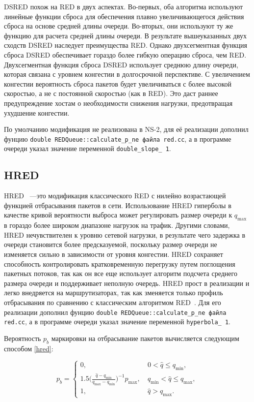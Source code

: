 DSRED похож на RED в двух аспектах. Во-первых, оба алгоритма используют линейные функции сброса для обеспечения плавно 
увеличивающегося действия сброса на основе средней длины очереди. Во-вторых, они используют ту же функцию для расчета 
средней длины очереди. В результате вышеуказанных двух сходств DSRED наследует преимущества RED. 
Однако двухсегментная функция сброса DSRED обеспечивает гораздо более гибкую операцию сброса, чем RED.
Двухсегментная функция сброса DSRED использует среднюю длину очереди, которая связана с уровнем конгестии в долгосрочной перспективе. 
С увеличением конгестии вероятность сброса пакетов будет увеличиваться с более высокой скоростью, а не с постоянной скоростью (как в RED). 
Это даст раннее предупреждение хостам о необходимости снижения нагрузки, предотвращая ухудшение конгестии.

По умолчанию модификация не реализована в NS-2, для её реализации дополнил фунцию \verb|double REDQueue::calculate_p_ne файла red.cc|, 
а в программе очереди указал значение переменной \verb|double_slope_ 1|. 


\subsection{HRED}

HRED ~---это модификация классического RED с нилейно возрастающей функцией отбрасывания пакетов в сети.
Использование HRED гиперболы в качестве кривой вероятности выброса может регулировать размер очереди к $q_{\max}$ 
в гораздо более широком диапазоне нагрузок на трафик. Другими словами, HRED нечувствителен к уровню сетевой нагрузки, 
в результате чего задержка в очереди становится более предсказуемой, поскольку размер очереди не изменяется сильно в 
зависимости от уровня конгестии. HRED сохраняет способность контролировать кратковременную перегрузку путем поглощения 
пакетных потоков, так как он все еще использует алгоритм подсчета среднего размера очереди и поддерживает неполную очередь. 
HRED прост в реализации и легко внедряется на маршрутизаторах, так как зменяется только профиль отбрасывания по сравнению с 
классическим алгоритмом RED~\cite{HRED}. Для его реализации дополнил фунцию \verb|double REDQueue::calculate_p_ne файла red.cc|, 
а в программе очереди указал значение переменной \verb|hyperbola_ 1|.
 
Вероятность $p_{b}$ маркировки на
отбрасывание пакетов вычисляется следующим способом \eqref{hred}:

\begin{equation}
\label{hred}
p_{b} = \begin{cases}
        0, &  \ 0 < \hat{q} \leqslant q_{\min},
        \\
        1.5({\frac{\hat{q} - q_{\min}}{q_{\max} - q_{\min}})^{-1}} {p_{\max}}, & \ q_{\min} < \hat{q} \leqslant q_{\max},
        \\
        1, &  \ \hat{q} > q_{\max}.
\end{cases}
\end{equation}


